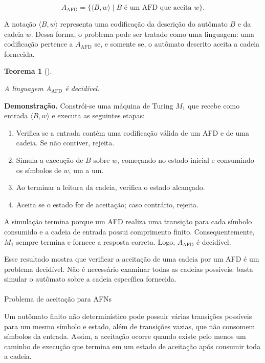 \documentclass[
  brazilian,
  letterpaper,
]{book}
\makeatletter
\let\oldparagraph\paragraph
\renewcommand{\paragraph}{
    \@ifstar
      \xxxParagraphStar
      \xxxParagraphNoStar
  }
\newcommand{\xxxParagraphStar}[1]{\oldparagraph*{#1}\mbox{}}
\newcommand{\xxxParagraphNoStar}[1]{\oldparagraph{#1}\mbox{}}
\providecommand{\tightlist}{%
  \setlength{\itemsep}{0pt}\setlength{\parskip}{0pt}}
\theoremstyle{plain}
\newtheorem{theorem}{Teorema}[chapter]
\theoremstyle{definition}
\theoremstyle{remark}
\makeatother
\begin{document}
\[
A_{\mathrm{AFD}}=\{\langle B,w\rangle\mid B\text{ é um AFD que aceita }w\}.
\]

A notação \(\langle B,w\rangle\) representa uma codificação da descrição
do autômato \(B\) e da cadeia \(w\). Dessa forma, o problema pode ser
tratado como uma linguagem: uma codificação pertence a
\(A_{\mathrm{AFD}}\) se, e somente se, o autômato descrito aceita a
cadeia fornecida.

\begin{theorem}[]\protect\hypertarget{thm-afd}{}\label{thm-afd}

A linguagem \(A_{\mathrm{AFD}}\) é decidível.

\end{theorem}

\textbf{Demonstração.} Constrói-se uma máquina de Turing \(M_1\) que
recebe como entrada \(\langle B,w\rangle\) e executa as seguintes
etapas:

\begin{enumerate}
\def\labelenumi{\arabic{enumi}.}
\tightlist
\item
  Verifica se a entrada contém uma codificação válida de um AFD e de uma
  cadeia. Se não contiver, rejeita.
\item
  Simula a execução de \(B\) sobre \(w\), começando no estado inicial e
  consumindo os símbolos de \(w\), um a um.
\item
  Ao terminar a leitura da cadeia, verifica o estado alcançado.
\item
  Aceita se o estado for de aceitação; caso contrário, rejeita.
\end{enumerate}

A simulação termina porque um AFD realiza uma transição para cada
símbolo consumido e a cadeia de entrada possui comprimento finito.
Consequentemente, \(M_1\) sempre termina e fornece a resposta correta.
Logo, \(A_{\mathrm{AFD}}\) é decidível.

Esse resultado mostra que verificar a aceitação de uma cadeia por um AFD
é um problema decidível. Não é necessário examinar todas as cadeias
possíveis: basta simular o autômato sobre a cadeia específica fornecida.

\paragraph{Problema de aceitação para
AFNs}\label{problema-de-aceitauxe7uxe3o-para-afns}

Um autômato finito não determinístico pode possuir várias transições
possíveis para um mesmo símbolo e estado, além de transições vazias, que
não consomem símbolos da entrada. Assim, a aceitação ocorre quando
existe pelo menos um caminho de execução que termina em um estado de
aceitação após consumir toda a cadeia.
\end{document}
